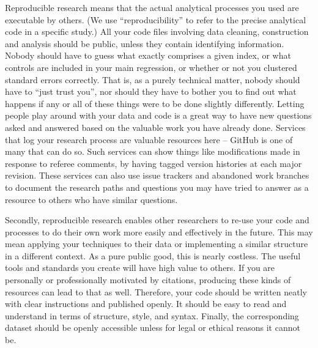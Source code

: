 Reproducible research means that the actual analytical processes you used are executable by others.\cite{dafoe2014science}
(We use ``reproducibility'' to refer to the precise analytical code in a specific study.)
All your code files involving data cleaning, construction and analysis
should be public, unless they contain identifying information.
Nobody should have to guess what exactly comprises a given index,
or what controls are included in your main regression,
or whether or not you clustered standard errors correctly.
That is, as a purely technical matter, nobody should have to ``just trust you'',
nor should they have to bother you to find out what happens
if any or all of these things were to be done slightly differently.\cite{simmons2011false,simonsohn2015specification,wicherts2016degrees}
Letting people play around with your data and code
is a great way to have new questions asked and answered
based on the valuable work you have already done.
Services that log your research process are valuable resources here --
GitHub is one of many that can do so.
Such services can show things like modifications made in response to referee comments,
by having tagged version histories at each major revision.
These services can also use issue trackers and abandoned work branches
to document the research paths and questions you may have tried to answer
as a resource to others who have similar questions.

Secondly, reproducible research
enables other researchers to re-use your code and processes
to do their own work more easily and effectively in the future.
This may mean applying your techniques to their data
or implementing a similar structure in a different context.
As a pure public good, this is nearly costless.
The useful tools and standards you create will have high value to others.
If you are personally or professionally motivated by citations,
producing these kinds of resources can lead to that as well.
Therefore, your code should be written neatly with clear instructions and published openly.
It should be easy to read and understand in terms of structure, style, and syntax.
Finally, the corresponding dataset should be openly accessible
unless for legal or ethical reasons it cannot be.

